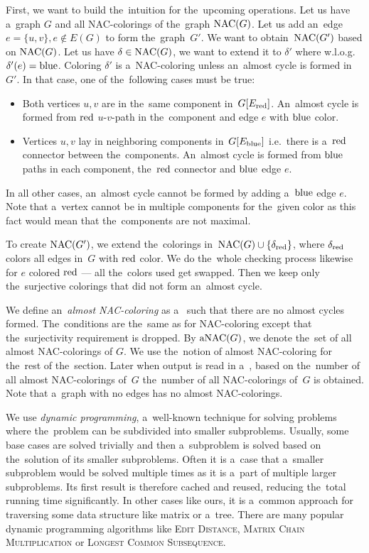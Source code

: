 First, we want to build the~intuition for the~upcoming operations.
Let us have a~graph \( G \) and all NAC-colorings of the~graph \( \operatorname{NAC}(G) \).
Let us add an~edge \( e = \{u, v\}, e \not\in E(G) \) to form the~graph~\( G' \).
We want to obtain~\( \operatorname{NAC}(G') \) based on \( \operatorname{NAC}(G) \).
%
Let us have \( \delta \in \operatorname{NAC}(G) \),
we want to extend it to \( \delta' \) where w.l.o.g.\ \( \delta'(e) = \text{blue} \).
Coloring \( \delta' \) is a~NAC-coloring unless an~almost cycle is formed in~\( G' \).
In that case, one of the~following cases must be true:
%
\begin{itemize}
	\item Both vertices \( u, v \) are in the~same component in~\( G[E_\text{red}] \).
	      An~almost cycle is formed
	      from \( \text{red} \) \( u \)-\( v \)-path in the~component
	      and edge \( e \) with \( \text{blue} \) color.
	\item Vertices \( u, v \) lay in neighboring components in~\( G[E_\text{blue}] \)
	      i.e.\ there is a~\( \text{red} \) connector between the~components.
	      An~almost cycle is formed from \( \text{blue} \) paths in each component,
	      the~\( \text{red} \) connector and \( \text{blue} \) edge \( e \).
\end{itemize}
%
In all other cases, an~almost cycle cannot be formed by adding a~\( \text{blue} \) edge \( e \).
Note that a~vertex cannot be in multiple components for the~given color
as this fact would mean that the~components are not maximal.

To create \( \operatorname{NAC}(G') \), we extend the~colorings
in~\( \operatorname{NAC}(G) \cup \{ \delta_{\text{red}} \} \), where \( \delta_{\text{red}} \)
colors all edges in~\( G \) with \( \text{red} \) color.
We do the~whole checking process likewise
for \( e \) colored \( \text{red} \) --- all the~colors used get swapped.
Then we keep only the~surjective colorings that did not form an~almost cycle.

We define an~\emph{almost NAC-coloring}
as a~\rbcol{} such that there are no almost cycles formed.
The~conditions are the~same as for NAC-coloring
except that the~surjectivity requirement is dropped.
By \( \operatorname{aNAC}(G) \), we denote the~set of all almost NAC-colorings of \( G \).
We use the~notion of almost NAC-coloring for the~rest of the~section.
Later when output is read in a~\RootNode{},
based on the~number of all almost NAC-colorings of~\( G \)
the~number of all NAC-colorings of~\( G \) is obtained.
Note that a~graph with no edges has no almost NAC-colorings.

We use \emph{dynamic programming}, a~well-known technique for solving problems
where the~problem can be subdivided into smaller subproblems.
Usually, some base cases are solved trivially and then a~subproblem
is solved based on the~solution of its smaller subproblems.
%
Often it is a~case that a~smaller subproblem would be solved multiple times
as it is a~part of multiple larger subproblems.
Its first result is therefore cached and reused,
reducing the~total running time significantly.
%
In other cases like ours, it is a~common approach for traversing
some data structure like matrix or a~tree.
%
There are many popular dynamic programming algorithms
like \textsc{Edit Distance}, \textsc{Matrix Chain Multiplication} or \textsc{Longest Common Subsequence}.

